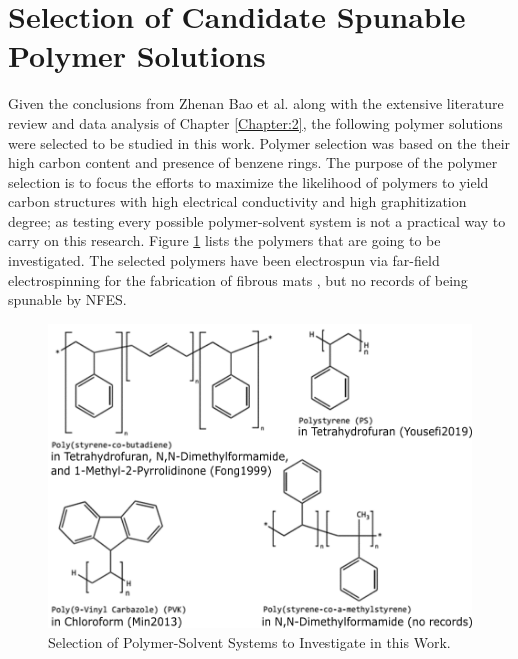 \section{Selection of Candidate Spunable Polymer Solutions}
Given the conclusions from Zhenan Bao et al. \cite{Liu2015a} along with the extensive literature review and data analysis of Chapter \ref{Chapter:2}, the following polymer solutions were selected to be studied in this work. Polymer selection was based on the their high carbon content and presence of benzene rings. The purpose of the polymer selection is to focus the efforts to maximize the likelihood of polymers to yield carbon structures with high electrical conductivity and high graphitization degree; as testing every possible polymer-solvent system is not a practical way to carry on this research. Figure \ref{fig:selectedpolymers} lists the polymers that are going to be investigated. The selected polymers have been electrospun via far-field electrospinning for the fabrication of fibrous mats \cite{Fong1999, Min2013, Yousefi2019}, but no records of being spunable by NFES. 


\begin{figure}[!th]
\centering
\includegraphics[scale=0.55]{./Figures/selectedpolymers.png}
\decoRule
\caption[Selection of Polymer-Solvent Systems to Investigate in this Work]{Selection of Polymer-Solvent Systems to Investigate in this Work. \cite{Fong1999, Min2013, Yousefi2019}}
\label{fig:selectedpolymers}
\end{figure}

